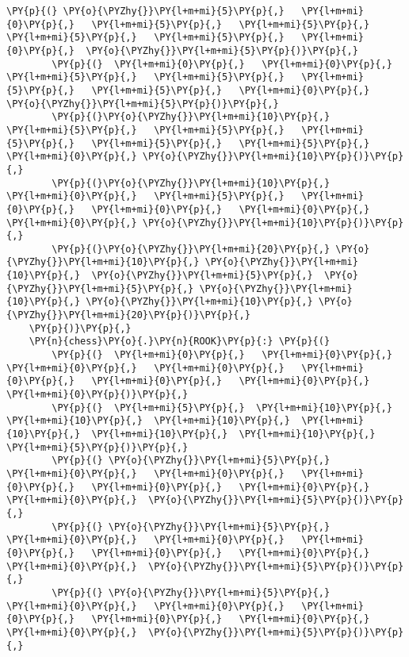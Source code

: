 \begin{tcolorbox}[fontupper=\linespread{.66}\selectfont, breakable, size=fbox, boxrule=1pt, pad at break*=1mm,colback=cellbackground, colframe=cellborder]
\begin{Verbatim}[commandchars=\\\{\}]
        \PY{p}{(} \PY{o}{\PYZhy{}}\PY{l+m+mi}{5}\PY{p}{,}   \PY{l+m+mi}{0}\PY{p}{,}   \PY{l+m+mi}{5}\PY{p}{,}   \PY{l+m+mi}{5}\PY{p}{,}   \PY{l+m+mi}{5}\PY{p}{,}   \PY{l+m+mi}{5}\PY{p}{,}   \PY{l+m+mi}{0}\PY{p}{,}  \PY{o}{\PYZhy{}}\PY{l+m+mi}{5}\PY{p}{)}\PY{p}{,}
        \PY{p}{(}  \PY{l+m+mi}{0}\PY{p}{,}   \PY{l+m+mi}{0}\PY{p}{,}   \PY{l+m+mi}{5}\PY{p}{,}   \PY{l+m+mi}{5}\PY{p}{,}   \PY{l+m+mi}{5}\PY{p}{,}   \PY{l+m+mi}{5}\PY{p}{,}   \PY{l+m+mi}{0}\PY{p}{,}  \PY{o}{\PYZhy{}}\PY{l+m+mi}{5}\PY{p}{)}\PY{p}{,}
        \PY{p}{(}\PY{o}{\PYZhy{}}\PY{l+m+mi}{10}\PY{p}{,}   \PY{l+m+mi}{5}\PY{p}{,}   \PY{l+m+mi}{5}\PY{p}{,}   \PY{l+m+mi}{5}\PY{p}{,}   \PY{l+m+mi}{5}\PY{p}{,}   \PY{l+m+mi}{5}\PY{p}{,}   \PY{l+m+mi}{0}\PY{p}{,} \PY{o}{\PYZhy{}}\PY{l+m+mi}{10}\PY{p}{)}\PY{p}{,}
        \PY{p}{(}\PY{o}{\PYZhy{}}\PY{l+m+mi}{10}\PY{p}{,}   \PY{l+m+mi}{0}\PY{p}{,}   \PY{l+m+mi}{5}\PY{p}{,}   \PY{l+m+mi}{0}\PY{p}{,}   \PY{l+m+mi}{0}\PY{p}{,}   \PY{l+m+mi}{0}\PY{p}{,}   \PY{l+m+mi}{0}\PY{p}{,} \PY{o}{\PYZhy{}}\PY{l+m+mi}{10}\PY{p}{)}\PY{p}{,}
        \PY{p}{(}\PY{o}{\PYZhy{}}\PY{l+m+mi}{20}\PY{p}{,} \PY{o}{\PYZhy{}}\PY{l+m+mi}{10}\PY{p}{,} \PY{o}{\PYZhy{}}\PY{l+m+mi}{10}\PY{p}{,}  \PY{o}{\PYZhy{}}\PY{l+m+mi}{5}\PY{p}{,}  \PY{o}{\PYZhy{}}\PY{l+m+mi}{5}\PY{p}{,} \PY{o}{\PYZhy{}}\PY{l+m+mi}{10}\PY{p}{,} \PY{o}{\PYZhy{}}\PY{l+m+mi}{10}\PY{p}{,} \PY{o}{\PYZhy{}}\PY{l+m+mi}{20}\PY{p}{)}\PY{p}{,}
    \PY{p}{)}\PY{p}{,}
    \PY{n}{chess}\PY{o}{.}\PY{n}{ROOK}\PY{p}{:} \PY{p}{(}
        \PY{p}{(}  \PY{l+m+mi}{0}\PY{p}{,}   \PY{l+m+mi}{0}\PY{p}{,}   \PY{l+m+mi}{0}\PY{p}{,}   \PY{l+m+mi}{0}\PY{p}{,}   \PY{l+m+mi}{0}\PY{p}{,}   \PY{l+m+mi}{0}\PY{p}{,}   \PY{l+m+mi}{0}\PY{p}{,}   \PY{l+m+mi}{0}\PY{p}{)}\PY{p}{,}
        \PY{p}{(}  \PY{l+m+mi}{5}\PY{p}{,}  \PY{l+m+mi}{10}\PY{p}{,}  \PY{l+m+mi}{10}\PY{p}{,}  \PY{l+m+mi}{10}\PY{p}{,}  \PY{l+m+mi}{10}\PY{p}{,}  \PY{l+m+mi}{10}\PY{p}{,}  \PY{l+m+mi}{10}\PY{p}{,}   \PY{l+m+mi}{5}\PY{p}{)}\PY{p}{,}
        \PY{p}{(} \PY{o}{\PYZhy{}}\PY{l+m+mi}{5}\PY{p}{,}   \PY{l+m+mi}{0}\PY{p}{,}   \PY{l+m+mi}{0}\PY{p}{,}   \PY{l+m+mi}{0}\PY{p}{,}   \PY{l+m+mi}{0}\PY{p}{,}   \PY{l+m+mi}{0}\PY{p}{,}   \PY{l+m+mi}{0}\PY{p}{,}  \PY{o}{\PYZhy{}}\PY{l+m+mi}{5}\PY{p}{)}\PY{p}{,}
        \PY{p}{(} \PY{o}{\PYZhy{}}\PY{l+m+mi}{5}\PY{p}{,}   \PY{l+m+mi}{0}\PY{p}{,}   \PY{l+m+mi}{0}\PY{p}{,}   \PY{l+m+mi}{0}\PY{p}{,}   \PY{l+m+mi}{0}\PY{p}{,}   \PY{l+m+mi}{0}\PY{p}{,}   \PY{l+m+mi}{0}\PY{p}{,}  \PY{o}{\PYZhy{}}\PY{l+m+mi}{5}\PY{p}{)}\PY{p}{,}
        \PY{p}{(} \PY{o}{\PYZhy{}}\PY{l+m+mi}{5}\PY{p}{,}   \PY{l+m+mi}{0}\PY{p}{,}   \PY{l+m+mi}{0}\PY{p}{,}   \PY{l+m+mi}{0}\PY{p}{,}   \PY{l+m+mi}{0}\PY{p}{,}   \PY{l+m+mi}{0}\PY{p}{,}   \PY{l+m+mi}{0}\PY{p}{,}  \PY{o}{\PYZhy{}}\PY{l+m+mi}{5}\PY{p}{)}\PY{p}{,}

\end{Verbatim}
\end{tcolorbox}
